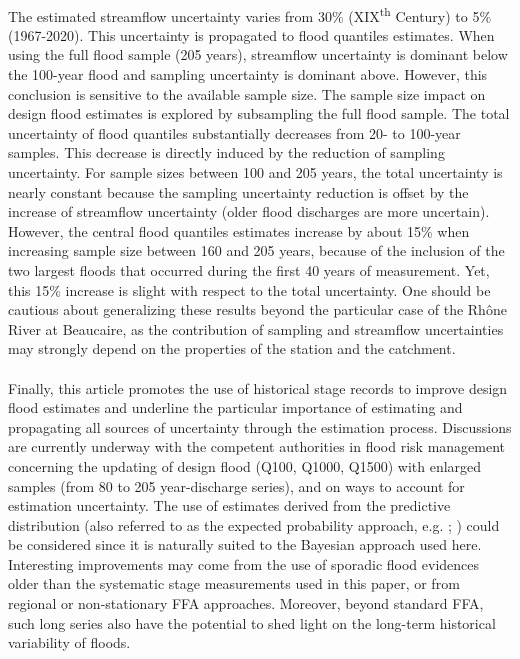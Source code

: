 \documentclass[11pt]{article}
\begin{document}
    \paragraph{} The estimated streamflow uncertainty varies from 30\% (XIX\textsuperscript{th} Century) to 5\% (1967-2020). This uncertainty is propagated to flood quantiles estimates. When using the full flood sample (205 years), streamflow uncertainty is dominant below the 100-year flood and sampling uncertainty is dominant above. However, this conclusion is sensitive to the available sample size. The sample size impact on design flood estimates is explored by subsampling the full flood sample.
    The total uncertainty of flood quantiles substantially decreases from 20- to 100-year samples. This decrease is directly induced by the reduction of sampling uncertainty. For sample sizes between 100 and 205 years, the total uncertainty is nearly constant because the sampling uncertainty reduction is offset by the increase of streamflow uncertainty (older flood discharges are more uncertain). However, the central flood quantiles estimates increase by about 15\% when increasing sample size between 160 and 205 years, because of the inclusion of the two largest floods that occurred during the first 40 years of measurement. Yet, this 15\% increase is slight with respect to the total uncertainty. One should be cautious about generalizing these results beyond the particular case of the Rhône River at Beaucaire, as the contribution of sampling and streamflow uncertainties may strongly depend on the properties of the station and the catchment.
    \paragraph{}
    Finally, this article promotes the use of historical stage records to improve design flood estimates and underline the particular importance of estimating and propagating all sources of uncertainty through the estimation process. Discussions are currently underway with the competent authorities in flood risk management concerning the updating of design flood (Q100, Q1000, Q1500) with enlarged samples (from 80 to 205 year-discharge series), and on ways to account for estimation uncertainty. The use of estimates derived from the predictive distribution (also referred to as the expected probability approach, e.g. \cite{kuczera_comprehensive_1999}; \cite{renard_data-based_2013}) could be considered since it is naturally suited to the Bayesian approach used here. Interesting improvements may come from the use of sporadic flood evidences older than the systematic stage measurements used in this paper, or from regional or non-stationary FFA approaches. Moreover, beyond standard FFA, such long series also have the potential to shed light on the long-term historical variability of floods. 
\end{document}
